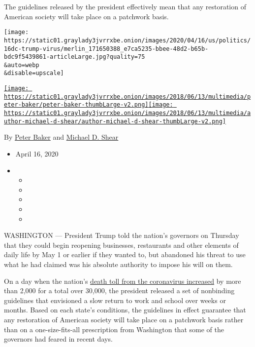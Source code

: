 The guidelines released by the president effectively mean that any
restoration of American society will take place on a patchwork basis.

\texttt{[image: https://static01.graylady3jvrrxbe.onion/images/2020/04/16/us/politics/16dc-trump-virus/merlin\_171650388\_e7ca5235-bbee-48d2-b65b-bdc9f5439861-articleLarge.jpg?quality=75\\\&auto=webp\\\&disable=upscale]}

\href{https://www.nytimes3xbfgragh.onion/by/peter-baker}{\texttt{[image: https://static01.graylady3jvrrxbe.onion/images/2018/06/13/multimedia/peter-baker/peter-baker-thumbLarge-v2.png]}}\href{https://www.nytimes3xbfgragh.onion/by/michael-d-shear}{\texttt{[image: https://static01.graylady3jvrrxbe.onion/images/2018/06/13/multimedia/author-michael-d-shear/author-michael-d-shear-thumbLarge-v2.png]}}

By \href{https://www.nytimes3xbfgragh.onion/by/peter-baker}{Peter Baker}
and \href{https://www.nytimes3xbfgragh.onion/by/michael-d-shear}{Michael
D. Shear}

\begin{itemize}
\item
  April 16, 2020
\item
  \begin{itemize}
  \item
  \item
  \item
  \item
  \item
  \end{itemize}
\end{itemize}

WASHINGTON --- President Trump told the nation's governors on Thursday
that they could begin reopening businesses, restaurants and other
elements of daily life by May 1 or earlier if they wanted to, but
abandoned his threat to use what he had claimed was his absolute
authority to impose his will on them.

On a day when the nation's
\href{https://www.nytimes3xbfgragh.onion/interactive/2020/world/coronavirus-maps.html}{death
toll from the coronavirus increased} by more than 2,000 for a total over
30,000, the president released a set of nonbinding guidelines that
envisioned a slow return to work and school over weeks or months. Based
on each state's conditions, the guidelines in effect guarantee that any
restoration of American society will take place on a patchwork basis
rather than on a one-size-fits-all prescription from Washington that
some of the governors had feared in recent days.

